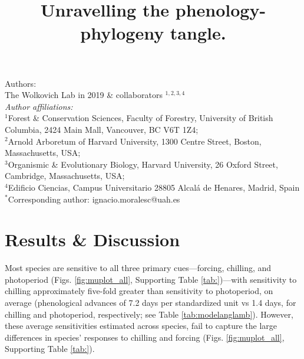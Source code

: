 \documentclass{article}\usepackage[]{graphicx}\usepackage[]{color}
\title{Unravelling the phenology-phylogeny tangle.}
\begin{document}
\maketitle

\noindent Authors:\\
The Wolkovich Lab in 2019 \& collaborators $^{1,2,3,4}$ %
\vspace{2ex}\\
\emph{Author affiliations:}\\
$^{1}$Forest \& Conservation Sciences, Faculty of Forestry, University of British Columbia, 2424 Main Mall, Vancouver, BC V6T 1Z4;\\
$^{2}$Arnold Arboretum of Harvard University, 1300 Centre Street, Boston, Massachusetts, USA;\\
$^{3}$Organismic \& Evolutionary Biology, Harvard University, 26 Oxford Street, Cambridge, Massachusetts, USA;\\
$^{4}$Edificio Ciencias, Campus Universitario 28805 Alcalá de Henares, Madrid, Spain\\
 

\vspace{2ex}
$^*$Corresponding author: ignacio.moralesc@uah.es\\
\renewcommand{\thetable}{\arabic{table}}
\renewcommand{\thefigure}{\arabic{figure}}
\renewcommand{\labelitemi}{$-$}

\clearpage







\section*{Results \& Discussion}

Most species are sensitive to all three primary cues---forcing, chilling, and photoperiod (Figs. \ref{fig:muplot_all}, Supporting Table \ref{tab:})\citep[see also][]{Laube:2014a,ettinger2020}---with sensitivity to chilling approximately five-fold greater than sensitivity to photoperiod, on average (phenological advances of 7.2 days per standardized unit vs 1.4 days, for chilling and photoperiod, respectively; see Table \ref{tab:modelanglamb}). However, these average sensitivities estimated across species, fail to capture the large differences in species' responses to chilling and forcing (Figs. \ref{fig:muplot_all}, Supporting Table \ref{tab:}). 
\end{document}
